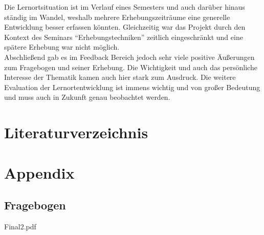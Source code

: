 \documentclass[11pt, a4paper]{article}
\begin{document}
Die Lernortsituation ist im Verlauf eines Semesters und auch darüber hinaus ständig im Wandel, weshalb mehrere Erhebungszeiträume eine generelle Entwicklung besser erfassen könnten. Gleichzeitig war das Projekt durch den Kontext des Seminars “Erhebungstechniken” zeitlich eingeschränkt und eine spätere Erhebung war nicht möglich.\\
Abschließend gab es im Feedback Bereich jedoch sehr viele positive Äußerungen zum Fragebogen und seiner Erhebung. Die Wichtigkeit und auch das persönliche Interesse der Thematik kamen auch hier stark zum Ausdruck. Die weitere Evaluation der Lernortentwicklung ist immens wichtig und von großer Bedeutung und muss auch in Zukunft genau beobachtet werden.


\newpage
\section{Literaturverzeichnis}
\printbibliography
\newpage
\section{Appendix}
\subsection{Fragebogen}

\begin{figure}[h]
	
\end{figure}
\pagestyle{plain}
\newpage
 {Final2.pdf}
\newpage
\end{document}
